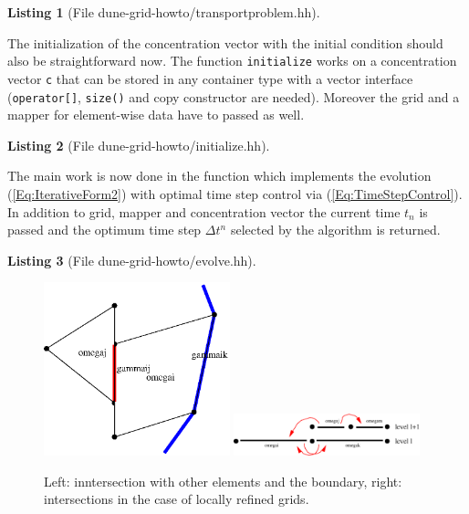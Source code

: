 \documentclass[11pt,a4paper,headinclude,footinclude,DIV16,normalheadings]{scrreprt}
\newtheorem{lst}{Listing}
\begin{document}
\begin{lst}[File dune-grid-howto/transportproblem.hh] \mbox{}
\nopagebreak

\end{lst}

The initialization of the concentration vector with the initial
condition should also be straightforward now. The function
\lstinline!initialize! works on a concentration vector \lstinline!c!
that can be stored in any container type with a vector interface
(\lstinline!operator[]!, \lstinline!size()! and copy constructor are
needed). Moreover the grid and a mapper for element-wise data have to
passed as well. 

\begin{lst}[File dune-grid-howto/initialize.hh] \mbox{}
\nopagebreak

\end{lst}

The main work is now done in the function which implements the
evolution (\ref{Eq:IterativeForm2}) with optimal time step control via
(\ref{Eq:TimeStepControl}). In addition to grid, mapper and
concentration vector the current time $t_n$ is passed and the optimum
time step $\Delta t^n$ selected by the algorithm is returned.
\begin{lst}[File dune-grid-howto/evolve.hh] \mbox{} \label{List:evolve}
\nopagebreak

\end{lst}

\begin{figure}
\includegraphics[width=0.48\textwidth]{EPS/intersection}\hfill
\includegraphics[width=0.48\textwidth]{EPS/islocalref}
\caption{Left: inntersection with other elements and the boundary,
  right: intersections in the case of locally refined grids.}
\label{Fig:IsIt}
\end{figure}
\end{document}
